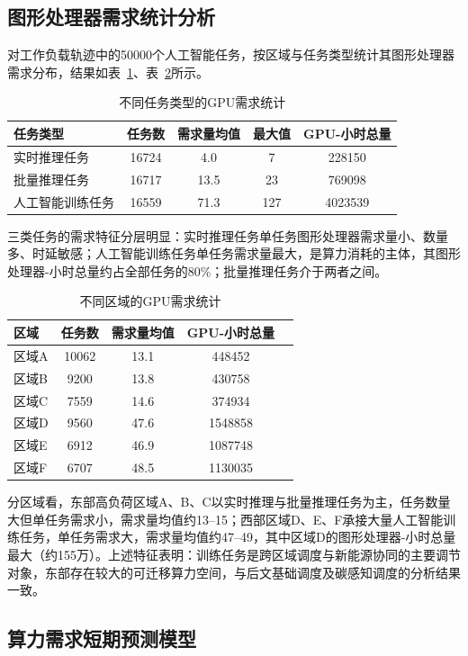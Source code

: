 \documentclass{ctexart}
\begin{document}
\subsection{图形处理器需求统计分析}
对工作负载轨迹中的50000个人工智能任务，按区域与任务类型统计其图形处理器需求分布，结果如表~\ref{tab:gpu_type}、表~\ref{tab:gpu_region}所示。

\begin{table}[H]
	\centering
	\caption{不同任务类型的GPU需求统计}
	\label{tab:gpu_type}
	\begin{tabular}{lcccc}
		\toprule
		任务类型&任务数&需求量均值&最大值&GPU-小时总量\\
		\midrule
		实时推理任务&16724&4.0&7&228150\\
		批量推理任务&16717&13.5&23&769098\\
		人工智能训练任务&16559&71.3&127&4023539\\
		\bottomrule
	\end{tabular}
\end{table}

三类任务的需求特征分层明显：实时推理任务单任务图形处理器需求量小、数量多、时延敏感；人工智能训练任务单任务需求量最大，是算力消耗的主体，其图形处理器-小时总量约占全部任务的80\%；批量推理任务介于两者之间。

\begin{table}[H]
	\centering
	\caption{不同区域的GPU需求统计}
	\label{tab:gpu_region}
	\begin{tabular}{lcccc}
		\toprule
		区域&任务数&需求量均值&GPU-小时总量\\
		\midrule
		区域A&10062&13.1&448452\\
		区域B&9200&13.8&430758\\
		区域C&7559&14.6&374934\\
		区域D&9560&47.6&1548858\\
		区域E&6912&46.9&1087748\\
		区域F&6707&48.5&1130035\\
		\bottomrule
	\end{tabular}
\end{table}

分区域看，东部高负荷区域A、B、C以实时推理与批量推理任务为主，任务数量大但单任务需求小，需求量均值约13–15；西部区域D、E、F承接大量人工智能训练任务，单任务需求大，需求量均值约47–49，其中区域D的图形处理器-小时总量最大（约155万）。上述特征表明：训练任务是跨区域调度与新能源协同的主要调节对象，东部存在较大的可迁移算力空间，与后文基础调度及碳感知调度的分析结果一致。

\subsection{算力需求短期预测模型}
\end{document}
